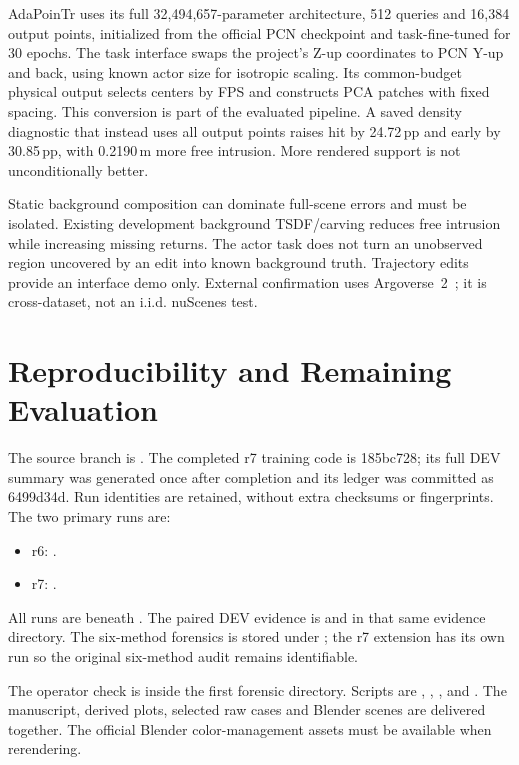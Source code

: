 AdaPoinTr uses its full 32,494,657-parameter architecture, 512 queries and 16,384 output points, initialized from the official PCN checkpoint and task-fine-tuned for 30 epochs. The task interface swaps the project's Z-up coordinates to PCN Y-up and back, using known actor size for isotropic scaling. Its common-budget physical output selects centers by FPS and constructs PCA patches with fixed spacing. This conversion is part of the evaluated pipeline. A saved density diagnostic that instead uses all output points raises hit by 24.72\,pp and early by 30.85\,pp, with 0.2190\,m more free intrusion. More rendered support is not unconditionally better.

Static background composition can dominate full-scene errors and must be isolated. Existing development background TSDF/carving reduces free intrusion while increasing missing returns. The actor task does not turn an unobserved region uncovered by an edit into known background truth. Trajectory edits provide an interface demo only. External confirmation uses Argoverse~2~\cite{av2}; it is cross-dataset, not an i.i.d. nuScenes test.

\section{Reproducibility and Remaining Evaluation}
The source branch is . The completed r7 training code is 185bc728; its full DEV summary was generated once after completion and its ledger was committed as 6499d34d. Run identities are retained, without extra checksums or fingerprints. The two primary runs are:
\begin{itemize}
 \item r6: .
 \item r7: .
\end{itemize}
All runs are beneath . The paired DEV evidence is  and  in that same evidence directory. The six-method forensics is stored under ; the r7 extension has its own run so the original six-method audit remains identifiable.

The operator check is  inside the first forensic directory. Scripts are , , , and . The manuscript, derived plots, selected raw cases and Blender scenes are delivered together. The official Blender color-management assets must be available when rerendering.

